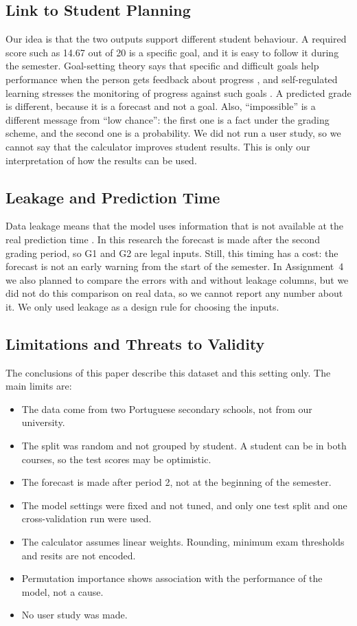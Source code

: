 \documentclass[10pt,twocolumn,a4paper]{article}
\newcommand{\Gtwo}{G2}
\newcommand{\Gone}{G1}
\begin{document}
\subsection{Link to Student Planning}
Our idea is that the two outputs support different student behaviour. A required score such as 14.67 out of 20 is a specific goal, and it is easy to follow it during the semester. Goal-setting theory says that specific and difficult goals help performance when the person gets feedback about progress \cite{locke2002}, and self-regulated learning stresses the monitoring of progress against such goals \cite{zimmerman2002}. A predicted grade is different, because it is a forecast and not a goal. Also, ``impossible'' is a different message from ``low chance'': the first one is a fact under the grading scheme, and the second one is a probability. We did not run a user study, so we cannot say that the calculator improves student results. This is only our interpretation of how the results can be used.

\subsection{Leakage and Prediction Time}
Data leakage means that the model uses information that is not available at the real prediction time \cite{kaufman2012}. In this research the forecast is made after the second grading period, so \Gone{} and \Gtwo{} are legal inputs. Still, this timing has a cost: the forecast is not an early warning from the start of the semester. In Assignment~4 we also planned to compare the errors with and without leakage columns, but we did not do this comparison on real data, so we cannot report any number about it. We only used leakage as a design rule for choosing the inputs.

\subsection{Limitations and Threats to Validity}
The conclusions of this paper describe this dataset and this setting only. The main limits are:
\begin{itemize}
  \item The data come from two Portuguese secondary schools, not from our university.
  \item The split was random and not grouped by student. A student can be in both courses, so the test scores may be optimistic.
  \item The forecast is made after period 2, not at the beginning of the semester.
  \item The model settings were fixed and not tuned, and only one test split and one cross-validation run were used.
  \item The calculator assumes linear weights. Rounding, minimum exam thresholds and resits are not encoded.
  \item Permutation importance shows association with the performance of the model, not a cause.
  \item No user study was made.
\end{itemize}
\end{document}
